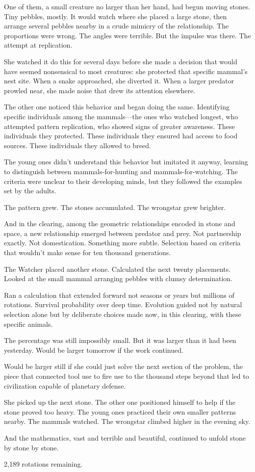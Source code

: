One of them, a small creature no larger than her hand, had begun moving stones. Tiny pebbles, mostly. It would watch where she placed a large stone, then arrange several pebbles nearby in a crude mimicry of the relationship. The proportions were wrong. The angles were terrible. But the impulse was there. The attempt at replication.

She watched it do this for several days before she made a decision that would have seemed nonsensical to most creatures: she protected that specific mammal's nest site. When a snake approached, she diverted it. When a larger predator prowled near, she made noise that drew its attention elsewhere.

The other one noticed this behavior and began doing the same. Identifying specific individuals among the mammals—the ones who watched longest, who attempted pattern replication, who showed signs of greater awareness. These individuals they protected. These individuals they ensured had access to food sources. These individuals they allowed to breed.

The young ones didn't understand this behavior but imitated it anyway, learning to distinguish between mammals-for-hunting and mammals-for-watching. The criteria were unclear to their developing minds, but they followed the examples set by the adults.

The pattern grew. The stones accumulated. The wrongstar grew brighter.

And in the clearing, among the geometric relationships encoded in stone and space, a new relationship emerged between predator and prey. Not partnership exactly. Not domestication. Something more subtle. Selection based on criteria that wouldn't make sense for ten thousand generations.

The Watcher placed another stone. Calculated the next twenty placements. Looked at the small mammal arranging pebbles with clumsy determination.

Ran a calculation that extended forward not seasons or years but millions of rotations. Survival probability over deep time. Evolution guided not by natural selection alone but by deliberate choices made now, in this clearing, with these specific animals.

The percentage was still impossibly small. But it was larger than it had been yesterday. Would be larger tomorrow if the work continued.

Would be larger still if she could just solve the next section of the problem, the piece that connected tool use to fire use to the thousand steps beyond that led to civilization capable of planetary defense.

She picked up the next stone. The other one positioned himself to help if the stone proved too heavy. The young ones practiced their own smaller patterns nearby. The mammals watched. The wrongstar climbed higher in the evening sky.

And the mathematics, vast and terrible and beautiful, continued to unfold stone by stone by stone.

2,189 rotations remaining.

